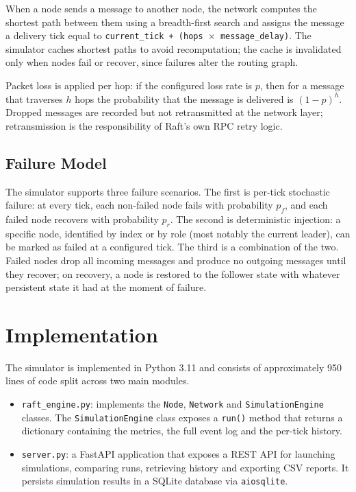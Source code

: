 When a node sends a message to another node, the network computes the shortest path between them using a breadth-first search and assigns the message a delivery tick equal to \texttt{current\_tick + (hops $\times$ message\_delay)}. The simulator caches shortest paths to avoid recomputation; the cache is invalidated only when nodes fail or recover, since failures alter the routing graph.

Packet loss is applied per hop: if the configured loss rate is $p$, then for a message that traverses $h$ hops the probability that the message is delivered is $(1-p)^h$. Dropped messages are recorded but not retransmitted at the network layer; retransmission is the responsibility of Raft's own RPC retry logic.

\subsection{Failure Model}

The simulator supports three failure scenarios. The first is per-tick stochastic failure: at every tick, each non-failed node fails with probability $p_f$, and each failed node recovers with probability $p_r$. The second is deterministic injection: a specific node, identified by index or by role (most notably the current leader), can be marked as failed at a configured tick. The third is a combination of the two. Failed nodes drop all incoming messages and produce no outgoing messages until they recover; on recovery, a node is restored to the follower state with whatever persistent state it had at the moment of failure.

\section{Implementation}

The simulator is implemented in Python 3.11 and consists of approximately 950 lines of code split across two main modules.

\begin{itemize}
    \item \texttt{raft\_engine.py}: implements the \texttt{Node}, \texttt{Network} and \texttt{SimulationEngine} classes. The \texttt{SimulationEngine} class exposes a \texttt{run()} method that returns a dictionary containing the metrics, the full event log and the per-tick history.
    \item \texttt{server.py}: a FastAPI application that exposes a REST API for launching simulations, comparing runs, retrieving history and exporting CSV reports. It persists simulation results in a SQLite database via \texttt{aiosqlite}.
\end{itemize}


